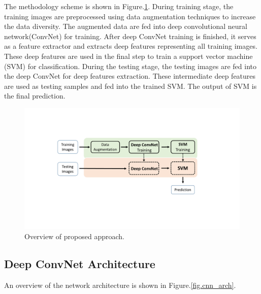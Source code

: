
The methodology scheme is shown in Figure.\ref{fig.method}. 
%
During training stage, the training images are preprocessed using data augmentation techniques to increase the data diversity.  The augmented data are fed into deep convolutional neural network(ConvNet) for training. After deep ConvNet training is finished, it serves as a feature extractor and extracts deep features representing all training images. These deep features are used in the final step to train a support vector machine (SVM) for classification.
%
During the testing stage, the testing images are fed into the deep ConvNet for deep features extraction. These intermediate deep features are used as testing samples and fed into the trained SVM. The output of SVM is the final prediction.


\begin{figure}[!ht]
	\begin{center}
		\includegraphics[scale=0.38,clip=true,trim = 50mm 55mm 28mm 50mm]{fig/figs/method_overview.pdf}
	\end{center}
	\caption{Overview of proposed approach.} 
	\label{fig.method}
\end{figure}

\subsection{Deep ConvNet Architecture}
An overview of the network architecture is shown in Figure.\ref{fig.cnn_arch}. 

